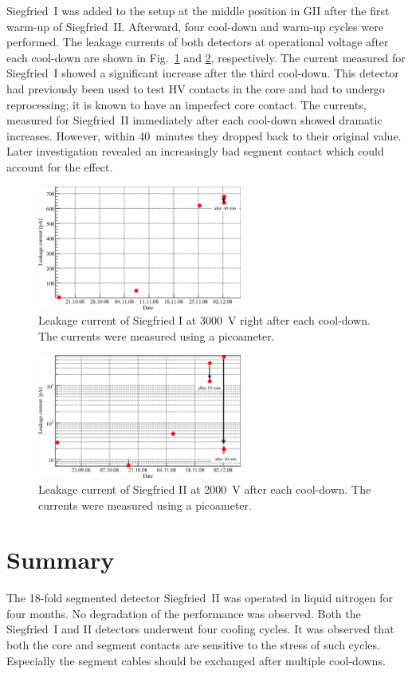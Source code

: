 Siegfried~I was added to the setup  at the middle position in GII after the first warm-up of Siegfried~II. Afterward, four cool-down and warm-up cycles were performed. The leakage currents of both detectors at operational voltage after each cool-down are shown in Fig.~\ref{fig:ii:lcs1} and \ref{fig:ii:lcs2}, respectively. The current measured for Siegfried~I showed a significant increase after the third cool-down. This detector had previously been used to test HV contacts in the core and had to undergo reprocessing; it is known to have an imperfect core contact. The currents, measured for Siegfried~II immediately after each cool-down showed  dramatic increases. However, within 40~minutes they dropped back to their original value. Later investigation revealed an increasingly bad segment contact which could account for the effect.

\begin{figure}[htbp]
\centering
\includegraphics[width=0.6\textwidth]{LCs1}
\caption{Leakage current of Siegfried I at 3000~V right after each cool-down. The currents were measured using a picoameter.}
\label{fig:ii:lcs1}
\end{figure}

\begin{figure}[htbp]
\centering
\includegraphics[width=0.6\textwidth, clip]{LCs2}
\caption{Leakage current of Siegfried II at 2000~V after each cool-down. The currents were measured using a picoameter.}
\label{fig:ii:lcs2}
\end{figure}

\section{Summary}
\label{sec:ii:sum}

The 18-fold segmented detector Siegfried~II was operated in liquid nitrogen for four months. No degradation of the performance was observed. Both the Siegfried~I and II detectors underwent four cooling cycles. It was observed that both the core and segment contacts are sensitive to the stress of such cycles. Especially the segment cables should be exchanged after multiple cool-downs.


